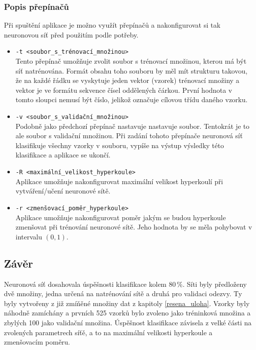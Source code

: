 \documentclass[a4paper, 11pt, titlepage]{article}
\begin{document}
\subsubsection*{Popis přepínačů}
Při spuštění aplikace je možno využít přepínačů a nakonfigurovat si tak neuronovou síť před použitím podle potřeby.
\begin{itemize}
\item \texttt{-t <soubor\_s\_trénovací\_množinou>}\\
	  Tento přepínač umožňuje zvolit soubor s trénovací množinou, kterou má být síť natrénována. Formát obsahu toho souboru by měl mít strukturu takovou, že na každé řádku se vyskytuje jeden vektor (vzorek) trénovací množiny a vektor je ve formátu sekvence čísel oddělených čárkou. První hodnota v tomto sloupci nemusí být číslo, jelikož označuje cílovou třídu daného vzorku.
\item \texttt{-v <soubor\_s\_validační\_množinou>}\\
      Podobně jako předchozí přepínač nastavuje nastavuje soubor. Tentokrát je to ale soubor s validační množinou. Při zadání tohoto přepínače neuronová síť klasifikuje všechny vzorky v souboru, vypíše na výstup výsledky této klasifikace a aplikace se ukončí.
\item \texttt{-R <maximální\_velikost\_hyperkoule>}\\
      Aplikace umožňuje nakonfigurovat maximální velikost hyperkoulí při vytváření/učení neuronové sítě.
\item \texttt{-r <zmenšovací\_poměr\_hyperkoule>}\\
	  Aplikace umožňuje nakonfigurovat poměr jakým se budou hyperkoule zmenšovat při trénování neuronové sítě. Jeho hodnota by se měla pohybovat v intervalu $(0,1)$.
\end{itemize}

\subsection{Závěr}
Neuronová síť dosahovala úspěšnosti klasifikace kolem 80\,\%. Síti byly předloženy dvě množiny, jedna určená na natrénování sítě a druhá pro validaci odezvy. Ty byly vytvořeny z již zmíňěné množiny dat z kapitoly \ref{resena_uloha}. Vzorky byly náhodně zamíchány a prvních 525 vzorků bylo zvoleno jako tréninková množina a zbylých 100 jako validační množina. Úspěšnost klasifikace závisela z velké části na zvolených parametrech síťě, a to na maximální velikosti hyperkoule a zmenšovacím poměru.

\newpage
\raggedright

\end{document}
